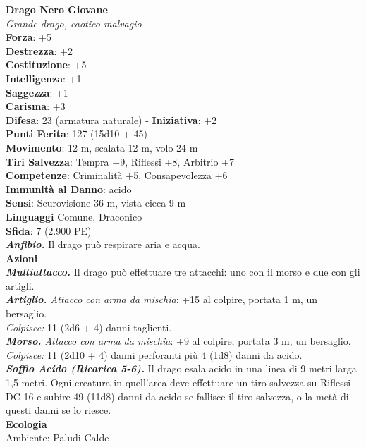 \begin{multicols}{2}
\medskip\textbf{Drago Nero Giovane}\\
\emph{Grande drago, caotico malvagio}\\
\textbf{Forza}: +5\\
\textbf{Destrezza}: +2\\
\textbf{Costituzione}: +5\\
\textbf{Intelligenza}: +1\\
\textbf{Saggezza}: +1\\
\textbf{Carisma}: +3\\
\textbf{Difesa}: 23 (armatura naturale) - \textbf{Iniziativa}: +2\\
\textbf{Punti Ferita}: 127 (15d10 + 45)\\
\textbf{Movimento}: 12 m, scalata 12 m, volo 24 m\\
\textbf{Tiri Salvezza}: Tempra +9, Riflessi +8, Arbitrio +7\\
\textbf{Competenze}: Criminalità +5, Consapevolezza +6\\
\textbf{Immunità al Danno}: acido\\
\textbf{Sensi}: Scurovisione 36 m, vista cieca 9 m\\
\textbf{Linguaggi} Comune, Draconico\\
\textbf{Sfida}: 7 (2.900 PE)\smallskip\\
\emph{\textbf{Anfibio.}} Il drago può respirare aria e acqua.\\
\smallskip\textbf{Azioni}\\
\emph{\textbf{Multiattacco.}} Il drago può effettuare tre attacchi: uno con il morso e due con gli artigli.\\
\emph{\textbf{Artiglio.} Attacco con arma da mischia}: +15 al colpire, portata 1 m, un bersaglio.\\
\emph{Colpisce:} 11 (2d6 + 4) danni taglienti.\\
\emph{\textbf{Morso.} Attacco con arma da mischia}: +9 al colpire, portata 3 m, un bersaglio.\\
\emph{Colpisce:} 11 (2d10 + 4) danni perforanti più 4 (1d8) danni da acido.\\
\emph{\textbf{Soffio Acido (Ricarica 5-6).}} Il drago esala acido in una linea di 9 metri larga 1,5 metri. Ogni creatura in quell'area deve effettuare un tiro salvezza su Riflessi DC  16 e subire 49 (11d8) danni da acido se fallisce il tiro salvezza, o la metà di questi danni se lo riesce.\\
\textbf{Ecologia}\\
Ambiente: Paludi Calde\\

\end{multicols}
